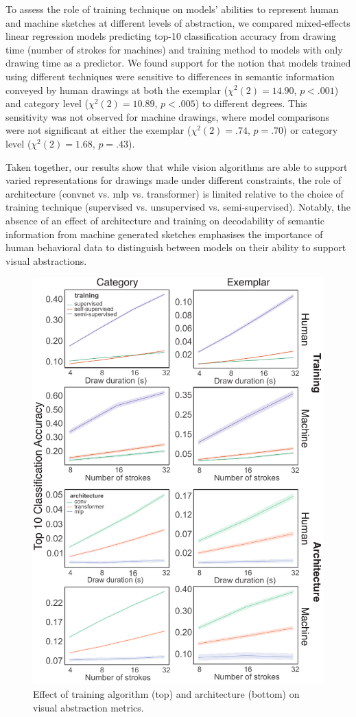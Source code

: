 \documentclass[10pt,letterpaper]{article}
\begin{document}
To assess the role of training technique on models' abilities to represent human and machine sketches at different levels of abstraction, we compared mixed-effects linear regression models predicting top-10 classification accuracy from drawing time (number of strokes for machines) and training method to models with only drawing time as a predictor. 
We found support for the notion that models trained using different techniques were sensitive to differences in semantic information conveyed by human drawings at both the exemplar ($\chi^2(2) = 14.90$, $p < .001$) and category level ($\chi^2(2) = 10.89$, $p<.005$) to different degrees.
This sensitivity was not observed for machine drawings, where model comparisons were not significant at either the exemplar ($\chi^2(2) = .74$, $p=.70$) or category level ($\chi^2(2) = 1.68$, $p=.43$).

Taken together, our results show that while vision algorithms are able to support varied representations for drawings made under different constraints, the role of architecture (convnet vs. mlp vs. transformer) is limited relative to the choice of training technique (supervised vs. unsupervised vs. semi-supervised). Notably, the absence of an effect of architecture and training on decodability of semantic information from machine generated sketches emphasises the importance of human behavioral data to distinguish between models on their ability to support visual abstractions.

\begin{figure}[ht!]
    \centering
    \includegraphics[width=.48\textwidth]{figures/VAB_train_arch.pdf}
    \vspace{-2em}
    \caption{Effect of training algorithm (top) and architecture (bottom) on visual abstraction metrics.}
    \label{fig:train_arch}
    \vspace{-2em}
\end{figure}
\end{document}
